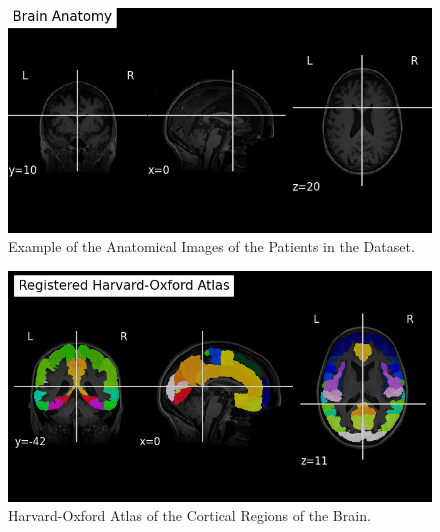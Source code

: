 \documentclass[12pt]{article}
\begin{document}
\begin{figure}[h]  %
    \centering
    \includegraphics[width=\textwidth]{"../img/anatomy.png"}  %
    \caption{Example of the Anatomical Images of the Patients in the Dataset.}
    \label{fig:anatomy}  %
\end{figure}

\FloatBarrier  %

\begin{figure}[h]  %
    \centering
    \includegraphics[width=\textwidth]{"../img/cortex.png"}  %
    \caption{Harvard-Oxford Atlas of the Cortical Regions of the Brain.}
    \label{fig:cortex}  %
\end{figure}

\FloatBarrier  %
\end{document}
